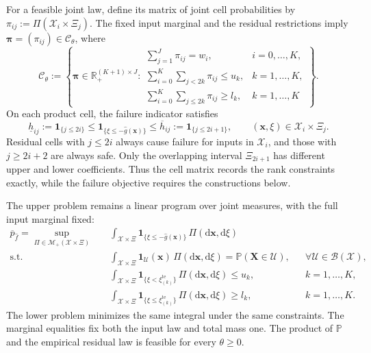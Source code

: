 For a feasible joint law, define its matrix of joint cell probabilities by $\pi_{ij}:=\Pi(\mathcal X_i\times\Xi_j)$. The fixed input marginal and the residual restrictions imply $\bm\pi=(\pi_{ij})\in\mathcal C_\theta$, where
\begin{equation}
  \mathcal C_\theta:=\left\{\bm\pi\in\mathbb R_+^{(K+1)\times J}:
  \begin{array}{ll}
    \displaystyle\sum_{j=1}^{J}\pi_{ij}=w_i,&i=0,\ldots,K,\\[1mm]
    \displaystyle\sum_{i=0}^{K}\sum_{j<2k}\pi_{ij}\le u_k,&k=1,\ldots,K,\\[1mm]
    \displaystyle\sum_{i=0}^{K}\sum_{j\le2k}\pi_{ij}\ge l_k,&k=1,\ldots,K
  \end{array}\right\}.
  \label{eq-cell-mass-polytope}
\end{equation}
On each product cell, the failure indicator satisfies
\begin{equation}
  \underline h_{ij}:=\mathbf1_{\{j\le2i\}}
  \le\mathbf1_{\{\xi\le-\hat g(\bm x)\}}
  \le\overline h_{ij}:=\mathbf1_{\{j\le2i+1\}},
  \qquad (\bm x,\xi)\in\mathcal X_i\times\Xi_j.
  \label{eq-cell-costs}
\end{equation}
Residual cells with $j\le2i$ always cause failure for inputs in $\mathcal X_i$, and those with $j\ge2i+2$ are always safe. Only the overlapping interval $\Xi_{2i+1}$ has different upper and lower coefficients. Thus the cell matrix records the rank constraints exactly, while the failure objective requires the constructions below.

The upper problem remains a linear program over joint measures, with the full input marginal fixed:
\begin{equation}
  \begin{aligned}
    \overline p_{\hat f}
    =\sup_{\Pi\in\mathcal M_+(\mathcal X\times\Xi)}\quad&
      \int_{\mathcal X\times\Xi}\mathbf1_{\{\xi\le-\hat g(\bm x)\}}\,\Pi(\mathrm d\bm x,\mathrm d\xi)\\
    \text{s.t.}\quad&
      \int_{\mathcal X\times\Xi}\mathbf1_{\mathcal U}(\bm x)\,\Pi(\mathrm d\bm x,\mathrm d\xi)
        =\mathbb P(\bm X\in\mathcal U),&&\forall\mathcal U\in\mathcal B(\mathcal X),\\
    &\int_{\mathcal X\times\Xi}\mathbf1_{\{\xi<\xi_{(k)}^{\mathrm{te}}\}}\,\Pi(\mathrm d\bm x,\mathrm d\xi)\le u_k,
        &&k=1,\ldots,K,\\
    &\int_{\mathcal X\times\Xi}\mathbf1_{\{\xi\le\xi_{(k)}^{\mathrm{te}}\}}\,\Pi(\mathrm d\bm x,\mathrm d\xi)\ge l_k,
        &&k=1,\ldots,K.
  \end{aligned}
  \label{eq-measure-upper}
\end{equation}
The lower problem minimizes the same integral under the same constraints. The marginal equalities fix both the input law and total mass one. The product of $\mathbb P$ and the empirical residual law is feasible for every $\theta\ge0$.

